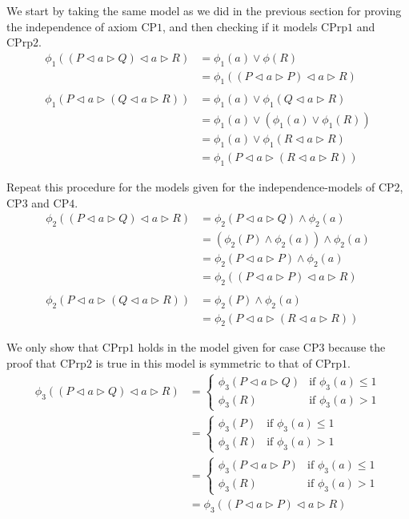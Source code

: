 \documentclass[a4paper,twoside,openright]{report}
\newcommand{\CP}[1]{\ensuremath{\mathrm{CP#1}}}
\newcommand{\CPrp}[1]{\ensuremath{\mathrm{CPrp#1}}}
\newcommand{\lef}{\ensuremath{\triangleleft}}
\newcommand{\rig}{\ensuremath{\triangleright}}
\begin{document}
We start by taking the same model as we did in the previous section for proving the independence of axiom \CP1, and then checking if it models \CPrp1 and \CPrp2.
\begin{align*}
\phi_1((P\lef a\rig Q)\lef a\rig R)
&=\phi_1(a)\vee\phi(R)\\
&=\phi_1((P\lef a\rig P)\lef a\rig R)\\\\
\phi_1(P\lef a\rig(Q\lef a\rig R))
&=\phi_1(a)\vee\phi_1(Q\lef a\rig R)\\
&=\phi_1(a)\vee(\phi_1(a)\vee\phi_1(R))\\
&=\phi_1(a)\vee\phi_1(R\lef a\rig R)\\
&=\phi_1(P\lef a\rig(R\lef a\rig R))
\end{align*}

Repeat this procedure for the models given for the independence-models of \CP2, \CP3 and \CP4.
\begin{align*}
\phi_2((P\lef a\rig Q)\lef a\rig R)
&=\phi_2(P\lef a\rig Q)\wedge\phi_2(a)\\
&=(\phi_2(P)\wedge\phi_2(a))\wedge\phi_2(a)\\
&=\phi_2(P\lef a\rig P)\wedge\phi_2(a)\\
&=\phi_2((P\lef a\rig P)\lef a\rig R)\\\\
\phi_2(P\lef a\rig(Q\lef a\rig R))
&=\phi_2(P)\wedge\phi_2(a)\\
&=\phi_2(P\lef a\rig(R\lef a\rig R))
\end{align*}

We only show that \CPrp1 holds in the model given for case \CP3 because the proof that \CPrp2 is true in this model is symmetric to that of \CPrp1.
\begin{align*}
\phi_3((P\lef a\rig Q)\lef a\rig R)
&=\begin{cases}
\phi_3(P\lef a\rig Q) & \text{if $\phi_3(a)\le 1$}\\
\phi_3(R) & \text{if $\phi_3(a)> 1$}
\end{cases}\\
&=\begin{cases}
\phi_3(P) & \text{if $\phi_3(a)\le 1$}\\
\phi_3(R) & \text{if $\phi_3(a)> 1$}
\end{cases}\\
&=\begin{cases}
\phi_3(P\lef a\rig P) & \text{if $\phi_3(a)\le 1$}\\
\phi_3(R) & \text{if $\phi_3(a)> 1$}
\end{cases}\\
&=\phi_3((P\lef a\rig P)\lef a\rig R)
\end{align*}
\end{document}
